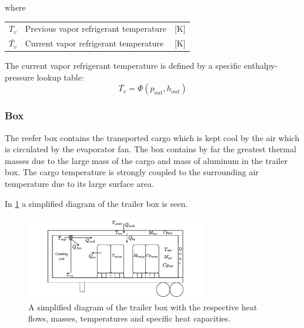 where
\smallskip
\begin{center}
	\begin{tabular}{l p{10cm} l}
		$T_v $       	 & Previous vapor refrigerant temperature                                  & [\si{K}] 						\\
		$\bar{T_v} $     & Current vapor refrigerant temperature                                   & [\si{K}]                  \\
	\end{tabular}
\end{center}
\medskip
The current vapor refrigerant temperature is defined by a specific enthalpy-pressure lookup table:
\begin{equation}
	\bar{T_v} = \Phi(p_{out}, h_{out})
\end{equation}


\newpage

\subsubsection{Box} \label{sec:mod_box}
The reefer box contains the transported cargo which is kept cool by the air which is circulated by the evaporator fan. The box contains by far the greatest thermal masses due to the large mass of the cargo and mass of aluminum in the trailer box. The cargo temperature is strongly coupled to the surrounding air temperature due to its large surface area.

In \cref{fig:box_diagram} a simplified diagram of the trailer box is seen.

\begin{figure}[h!]
	\centering
	\includegraphics[width=0.7\textwidth]{Graphics/Box.pdf}
	\caption{A simplified diagram of the trailer box with the respective heat flows, masses, temperatures and specific heat capacities.}
	\label{fig:box_diagram}
\end{figure}

